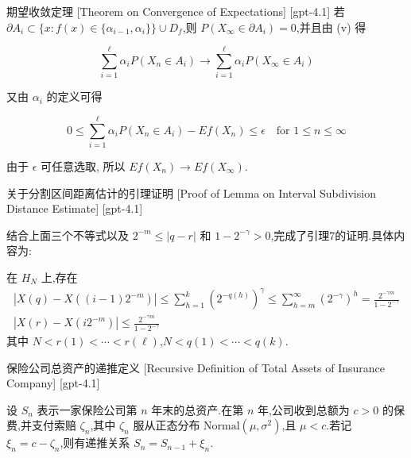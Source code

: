 \documentclass[UTF8]{ctexart}
\begin{document}
    \begin{thm}
        {期望收敛定理}
        [Theorem on Convergence of Expectations]
        [gpt-4.1]
        若 $\partial A_{i} \subset \{ x : f(x) \in \{ \alpha_{i-1}, \alpha_{i} \} \} \cup D_{f}$,则 $P(X_{\infty} \in \partial A_{i}) = 0$,并且由 (v) 得

\[
\sum_{i = 1}^{\ell} \alpha_{i} P(X_{n} \in A_{i}) \to \sum_{i = 1}^{\ell} \alpha_{i} P(X_{\infty} \in A_{i})
\]

又由 $\alpha_{i}$ 的定义可得

\[
0 \leq \sum_{i = 1}^{\ell} \alpha_{i} P(X_{n} \in A_{i}) - E f (X_{n}) \leq \epsilon \quad \text{for } 1 \leq n \leq \infty
\]

由于 $\epsilon$ 可任意选取, 所以 $E f ( X _ { n } ) \to E f ( X _ { \infty } )$.

    \end{thm}
    
    
    
    \begin{lma}
        {关于分割区间距离估计的引理证明}
        [Proof of Lemma on Interval Subdivision Distance Estimate]
        [gpt-4.1]
        
结合上面三个不等式以及 $2^{-m} \leq |q - r|$ 和 $1 - 2^{-\gamma} > 0$,完成了引理7的证明.具体内容为:

在 $H_{N}$ 上,存在
\[
\begin{array} { l }
  \displaystyle |X(q) - X((i-1) 2^{-m})| \leq \sum_{h=1}^{k} (2^{-q(h)})^{\gamma} \leq \sum_{h=m}^{\infty} (2^{-\gamma})^{h} = \frac{2^{-\gamma m}}{1 - 2^{-\gamma}} \\
  \displaystyle |X(r) - X(i 2^{-m})| \leq \frac{2^{-\gamma m}}{1 - 2^{-\gamma}}
\end{array}
\]
其中 $N < r(1) < \cdots < r(\ell)$,$N < q(1) < \cdots < q(k)$.

    \end{lma}
    
    
    
    \begin{dfn}
        {保险公司总资产的递推定义}
        [Recursive Definition of Total Assets of Insurance Company]
        [gpt-4.1]
        
设 $S_{n}$ 表示一家保险公司第 $n$ 年末的总资产.在第 $n$ 年,公司收到总额为 $c>0$ 的保费,并支付索赔 $\zeta_n$,其中 $\zeta_n$ 服从正态分布 $\mathrm{Normal}(\mu, \sigma^2)$,且 $\mu < c$.若记 $\xi_n = c - \zeta_n$,则有递推关系 $S_n = S_{n-1} + \xi_n$.

    \end{dfn}
    
\end{document}
